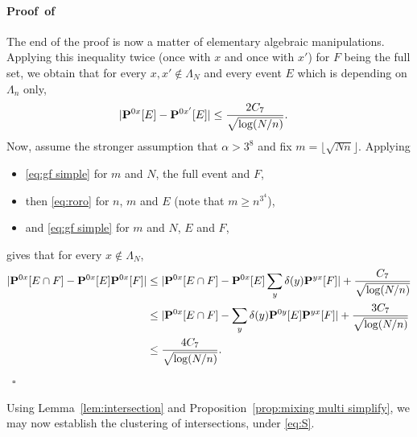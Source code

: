\documentclass[a4paper,oneside,11pt]{article}
\numberwithin{equation}{section}
\numberwithin{equation}{section}
\numberwithin{equation}{section}
\newenvironment{proof}[1][\relax]%
  {\paragraph{Proof\ifx#1\relax\else~of #1\fi}}%
  {~\hfill$\square$\par\bigskip}
\begin{document}
\begin{proof}
The end of the proof is now a matter of elementary algebraic manipulations. Applying this inequality twice (once with $x$ and once with $x'$) for $F$ being the full set, we obtain that for every $x,x'\notin \Lambda_N$ and every event $E$ which is depending on $\Lambda_n$ only,  
\begin{align}\label{eq:roro}
&|{\bf P}^{0x}[E]-{\bf P}^{0x'}[E]|\le \frac{2C_7}{\sqrt {\log(N/n)}}.
\end{align}
Now, assume the stronger assumption that $\alpha>3^8$ and fix $m=\lfloor\sqrt{Nn}\rfloor$. Applying
\begin{itemize}[noitemsep]
\item \eqref{eq:gf simple} for $m$ and $N$, the full event and $F$, 
\item then \eqref{eq:roro} for $n$, $m$ and $E$ (note that $m\ge n^{3^4}$), 
\item and \eqref{eq:gf simple} for $m$ and $N$, $E$ and $F$, 
\end{itemize}
gives that for every $x\notin \Lambda_N$, 
\begin{align}
|{\bf P}^{0x}[E\cap F]-{\bf P}^{0x}[E]{\bf P}^{0x}[F]|&\le |{\bf P}^{0x}[E\cap F]-{\bf P}^{0x}[E]\sum_{y}\delta(y){\bf P}^{yx}[F]|+\frac{C_7}{\sqrt{\log(N/n)}}\nonumber\\
&\le|{\bf P}^{0x}[E\cap F]-\sum_{y}\delta(y){\bf P}^{0y}[E]{\bf P}^{yx}[F]|+\frac{3C_7}{\sqrt{\log(N/n)}}\nonumber\\
&\le \frac{4C_7}{\sqrt {\log(N/n)}}.
\end{align}
\end{proof}


Using Lemma~\ref{lem:intersection} and Proposition~\ref{prop:mixing multi simplify}, we may now establish the clustering of intersections, under  \eqref{eq:S}.
\end{document}
